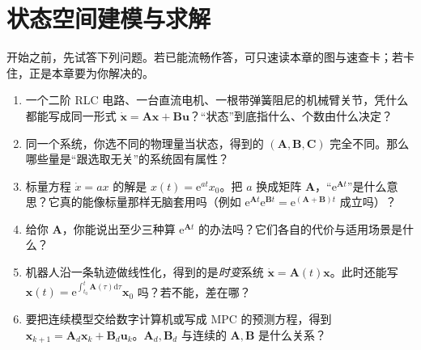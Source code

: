 \chapter{状态空间建模与求解}
\label{ch:statespace-basics}


\begin{practice}[前置自测]
开始之前，先试答下列问题。若已能流畅作答，可只速读本章的图与速查卡；若卡住，正是本章要为你解决的。
\begin{enumerate}
  \item 一个二阶 RLC 电路、一台直流电机、一根带弹簧阻尼的机械臂关节，凭什么都能写成同一形式 $\dot{\mathbf{x}}=\mathbf{A}\mathbf{x}+\mathbf{B}\mathbf{u}$？“状态”到底指什么、个数由什么决定？
  \item 同一个系统，你选不同的物理量当状态，得到的 $(\mathbf{A},\mathbf{B},\mathbf{C})$ 完全不同。那么哪些量是“跟选取无关”的系统固有属性？
  \item 标量方程 $\dot x=ax$ 的解是 $x(t)=\mathrm{e}^{at}x_0$。把 $a$ 换成矩阵 $\mathbf{A}$，“$\mathrm{e}^{\mathbf{A}t}$”是什么意思？它真的能像标量那样无脑套用吗（例如 $\mathrm{e}^{\mathbf{A}t}\mathrm{e}^{\mathbf{B}t}=\mathrm{e}^{(\mathbf{A}+\mathbf{B})t}$ 成立吗）？
  \item 给你 $\mathbf{A}$，你能说出至少三种算 $\mathrm{e}^{\mathbf{A}t}$ 的办法吗？它们各自的代价与适用场景是什么？
  \item 机器人沿一条轨迹做线性化，得到的是\emph{时变}系统 $\dot{\mathbf{x}}=\mathbf{A}(t)\mathbf{x}$。此时还能写 $\mathbf{x}(t)=\mathrm{e}^{\int_{t_0}^t\mathbf{A}(\tau)\mathrm{d}\tau}\mathbf{x}_0$ 吗？若不能，差在哪？
  \item 要把连续模型交给数字计算机或写成 MPC 的预测方程，得到 $\mathbf{x}_{k+1}=\mathbf{A}_d\mathbf{x}_k+\mathbf{B}_d\mathbf{u}_k$。$\mathbf{A}_d,\mathbf{B}_d$ 与连续的 $\mathbf{A},\mathbf{B}$ 是什么关系？
\end{enumerate}
\end{practice}

